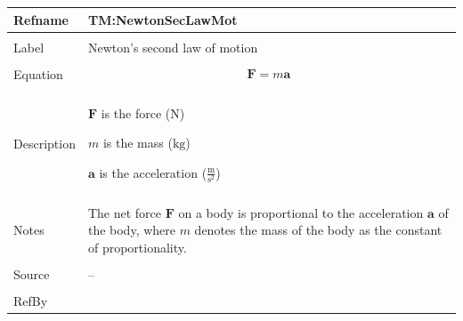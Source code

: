 \documentclass[12pt]{article}
\begin{document}
\begin{minipage}{\textwidth}
\begin{tabular}{>{\raggedright}p{}>{\raggedright\arraybackslash}p{}}
\toprule \textbf{Refname} & \textbf{TM:NewtonSecLawMot}
\label{TM:NewtonSecLawMot}
\\ \midrule \\
Label & Newton's second law of motion
        
\\ \midrule \\
Equation & \begin{displaymath}
           \symbf{F}=m \symbf{a}
           \end{displaymath}
\\ \midrule \\
Description & \begin{symbDescription}
              \item{$\symbf{F}$ is the force (${\text{N}}$)}
              \item{$m$ is the mass (${\text{kg}}$)}
              \item{$\symbf{a}$ is the acceleration ($\frac{\text{m}}{\text{s}^{2}}$)}
              \end{symbDescription}
\\ \midrule \\
Notes & The net force $\symbf{F}$ on a body is proportional to the acceleration $\symbf{a}$ of the body, where $m$ denotes the mass of the body as the constant of proportionality.
        
\\ \midrule \\
Source & --
         
\\ \midrule \\
RefBy & 
\\ \bottomrule
\end{tabular}
\end{minipage}
\vspace{\baselineskip}
\noindent
\end{document}
